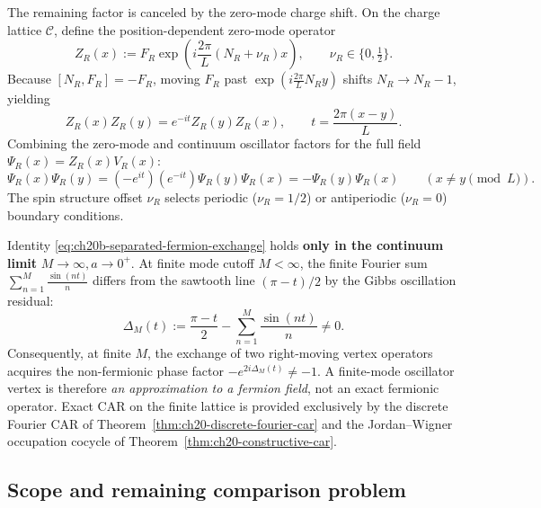 The remaining factor is canceled by the zero-mode charge shift.
On the charge lattice $\mathcal C$, define the position-dependent zero-mode operator
\begin{equation}
 Z_R(x) := F_R \exp\left( i \frac{2\pi}{L}(N_R + \nu_R) x \right), \qquad \nu_R \in \{0, \tfrac{1}{2}\}.
 \label{eq:ch20b-zero-mode-field}
\end{equation}
Because $[N_R, F_R] = -F_R$, moving $F_R$ past $\exp(i \frac{2\pi}{L} N_R y)$ shifts $N_R \to N_R - 1$, yielding
\begin{equation}
 Z_R(x) Z_R(y) = e^{-it} Z_R(y) Z_R(x), \qquad t = \frac{2\pi(x-y)}{L}.
 \label{eq:ch20b-zero-mode-exchange}
\end{equation}
Combining the zero-mode and continuum oscillator factors for the full field $\Psi_R(x) = Z_R(x) V_R(x)$:
\begin{equation}
 \Psi_R(x) \Psi_R(y) = (-e^{it})(e^{-it}) \Psi_R(y) \Psi_R(x) = -\Psi_R(y) \Psi_R(x) \qquad (x \ne y \pmod L).
 \label{eq:ch20b-separated-fermion-exchange}
\end{equation}
The spin structure offset $\nu_R$ selects periodic ($\nu_R = 1/2$) or antiperiodic ($\nu_R = 0$) boundary conditions.

\begin{note}
\label{warn:ch20b-finite-cutoff-exchange}
Identity \eqref{eq:ch20b-separated-fermion-exchange} holds \textbf{only in the continuum limit}
$M \to \infty, a \to 0^+$.  At finite mode cutoff $M < \infty$, the finite Fourier sum
$\sum_{n=1}^M \frac{\sin(nt)}{n}$ differs from the sawtooth line $(\pi-t)/2$ by the Gibbs
oscillation residual:
\[
 \Delta_M(t) := \frac{\pi - t}{2} - \sum_{n=1}^M \frac{\sin(nt)}{n} \ne 0.
\]
Consequently, at finite $M$, the exchange of two right-moving vertex operators acquires
the non-fermionic phase factor $-e^{2i\Delta_M(t)} \ne -1$.
A finite-mode oscillator vertex is therefore \emph{an approximation to a fermion field},
not an exact fermionic operator.  Exact CAR on the finite lattice is provided exclusively
by the discrete Fourier CAR of Theorem~\ref{thm:ch20-discrete-fourier-car} and the
Jordan--Wigner occupation cocycle of Theorem~\ref{thm:ch20-constructive-car}.
\end{note}

\subsection{Scope and remaining comparison problem}
\label{subsec:ch20b-scope}

